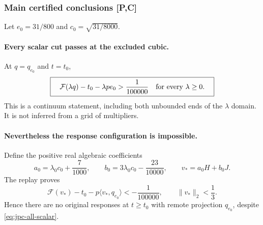 \subsubsection{Main certified conclusions [P,C]}
Let $e_0=31/800$ and $c_0=\sqrt{31/8000}$.

\paragraph{Every scalar cut passes at the excluded cubic.}
At $q=q_{e_0}$ and $t=t_0$,
\begin{equation}\label{eq:jpc-all-scalar}
 \boxed{\quad \mathcal F(\lambda q)-t_0-\lambda pe_0
     >\frac1{100000}\quad\hbox{for every }\lambda\ge0.\quad}
\end{equation}
This is a continuum statement, including both unbounded ends of the
$\lambda$ domain. It is not inferred from a grid of multipliers.

\paragraph{Nevertheless the response configuration is impossible.}
Define the positive real algebraic coefficients
\[
 a_0=\lambda_0c_0+\frac7{1000},\qquad
 b_0=3\lambda_0c_0-\frac{23}{10000},\qquad v_*=a_0H+b_0J.
\]
The replay proves
\begin{equation}\label{eq:jpc-separated}
 \mathcal F(v_*)-t_0-p\langle v_*,q_{e_0}\rangle
 <-\frac1{100000},\qquad \|v_*\|_2<\frac13.
\end{equation}
Hence there are no original responses at $t\ge t_0$ with remote
projection $q_{e_0}$, despite \eqref{eq:jpc-all-scalar}.

